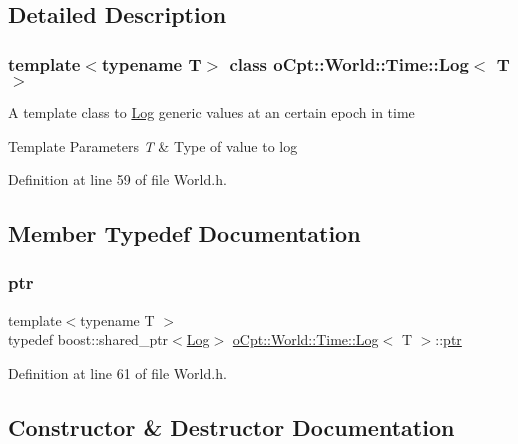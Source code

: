 \subsection{Detailed Description}
\subsubsection*{template$<$typename T$>$\newline
class o\+Cpt\+::\+World\+::\+Time\+::\+Log$<$ T $>$}

A template class to \hyperlink{classo_cpt_1_1_world_1_1_time_1_1_log}{Log} generic values at an certain epoch in time 
\begin{DoxyTemplParams}{Template Parameters}
{\em T} & Type of value to log \\
\hline
\end{DoxyTemplParams}


Definition at line 59 of file World.\+h.



\subsection{Member Typedef Documentation}
\hypertarget{classo_cpt_1_1_world_1_1_time_1_1_log_ac60728a183e1d17aa602cdc78fe2a6f5}{}\label{classo_cpt_1_1_world_1_1_time_1_1_log_ac60728a183e1d17aa602cdc78fe2a6f5} 
\subsubsection{\texorpdfstring{ptr}{ptr}}
{\footnotesize\ttfamily template$<$typename T $>$ \\
typedef boost\+::shared\+\_\+ptr$<$\hyperlink{classo_cpt_1_1_world_1_1_time_1_1_log}{Log}$>$ \hyperlink{classo_cpt_1_1_world_1_1_time_1_1_log}{o\+Cpt\+::\+World\+::\+Time\+::\+Log}$<$ T $>$\+::\hyperlink{classo_cpt_1_1_world_1_1_time_1_1_log_ac60728a183e1d17aa602cdc78fe2a6f5}{ptr}}



Definition at line 61 of file World.\+h.



\subsection{Constructor \& Destructor Documentation}
\hypertarget{classo_cpt_1_1_world_1_1_time_1_1_log_ac4bd19f2963c6f708a7578e4c23bf1d4}{}\label{classo_cpt_1_1_world_1_1_time_1_1_log_ac4bd19f2963c6f708a7578e4c23bf1d4} 
